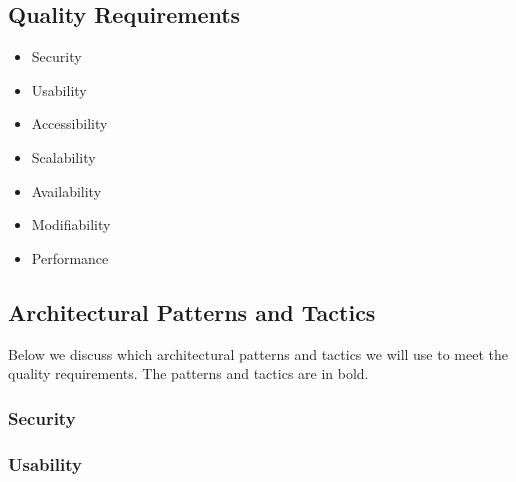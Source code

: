 \documentclass[12pt]{article}
\begin{document}
\subsection{Quality Requirements}

\begin{itemize}
  \item Security
  \item Usability
  \item Accessibility
  \item Scalability
  \item Availability
  \item Modifiability
  \item Performance
\end{itemize}

\subsection{Architectural Patterns and Tactics}

Below we discuss which architectural patterns and tactics we will use to meet the quality requirements. The patterns and tactics are in bold.

\subsubsection*{Security}

\subsubsection*{Usability}
\end{document}
